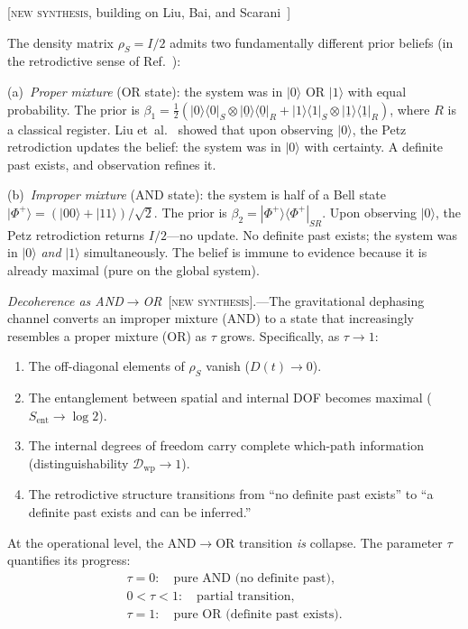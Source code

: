 \documentclass[prl,twocolumn,superscriptaddress,longbibliography,floatfix]{revtex4-2}
\newcommand{\ket}[1]{|#1\rangle}
\newcommand{\op}[2]{|#1\rangle\langle#2|}
\newcommand{\tauasym}{\tau}
\begin{document}
[\textsc{new synthesis}, building on Liu, Bai, and
Scarani~\cite{Liu2026}]

The density matrix $\rho_S = I/2$ admits two fundamentally different
prior beliefs (in the retrodictive sense of
Ref.~\cite{Parzygnat2023}):

(a)~\emph{Proper mixture} (OR state): the system was in $\ket{0}$ OR
$\ket{1}$ with equal probability.  The prior is
$\beta_1 = \frac{1}{2}(\op{0}{0}_S \otimes \op{\underline{0}}
{\underline{0}}_R + \op{1}{1}_S \otimes \op{\underline{1}}
{\underline{1}}_R)$,
where $R$ is a classical register.  Liu et~al.~\cite{Liu2026} showed
that upon observing $\ket{0}$, the Petz retrodiction updates the
belief: the system was in $\ket{0}$ with certainty.  A definite past
exists, and observation refines it.

(b)~\emph{Improper mixture} (AND state): the system is half of a
Bell state $\ket{\Phi^+} = (\ket{00} + \ket{11})/\sqrt{2}$.
The prior is $\beta_2 = \op{\Phi^+}{\Phi^+}_{SR}$.  Upon observing
$\ket{0}$, the Petz retrodiction returns $I/2$---no update.  No
definite past exists; the system was in $\ket{0}$ \emph{and}
$\ket{1}$ simultaneously.  The belief is immune to evidence because it
is already maximal (pure on the global system).

\emph{Decoherence as AND$\to$OR}~[\textsc{new synthesis}].---The
gravitational dephasing channel converts an improper mixture (AND) to
a state that increasingly resembles a proper mixture (OR) as
$\tauasym$ grows.  Specifically, as
$\tauasym \to 1$:
\begin{enumerate}
\item The off-diagonal elements of $\rho_S$ vanish ($D(t) \to 0$).
\item The entanglement between spatial and internal DOF becomes
  maximal ($S_{\mathrm{ent}} \to \log 2$).
\item The internal degrees of freedom carry complete which-path
  information (distinguishability
  $\mathcal{D}_{\mathrm{wp}} \to 1$).
\item The retrodictive structure transitions from ``no definite past
  exists'' to ``a definite past exists and can be inferred.''
\end{enumerate}
At the operational level, the AND$\to$OR transition
\emph{is} collapse.  The parameter $\tauasym$ quantifies its
progress:
\begin{equation}
\begin{array}{l}
\tauasym = 0: \quad \text{pure AND (no definite past)}, \\
0 < \tauasym < 1: \quad \text{partial transition}, \\
\tauasym = 1: \quad \text{pure OR (definite past exists)}.
\end{array}
\label{eq:and_or_spectrum}
\end{equation}
\end{document}
